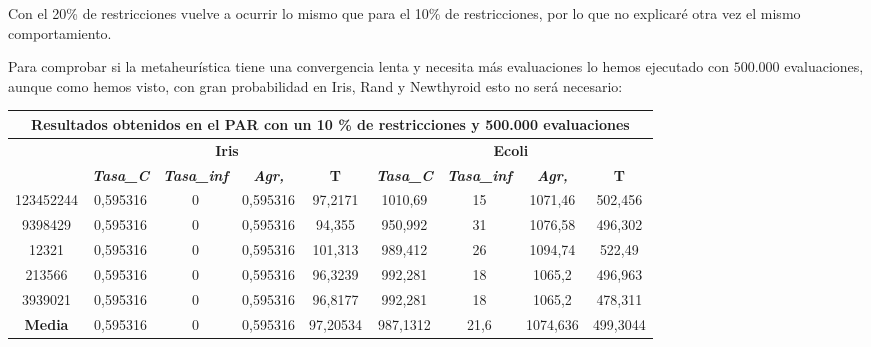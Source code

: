 \documentclass[12pt, spanish]{article}
\begin{document}
Con el 20\% de restricciones vuelve a ocurrir lo mismo que para el 10\% de restricciones, por lo que no explicaré otra vez el mismo comportamiento.

\newpage

Para comprobar si la metaheurística tiene una convergencia lenta y necesita más evaluaciones lo hemos ejecutado con $500.000$ evaluaciones, aunque como hemos visto, con gran probabilidad en Iris, Rand y Newthyroid esto no será necesario:

\begin{table}[H]
\begin{tabular}{|c|c|c|c|c|c|c|c|c|}
\hline
\multicolumn{9}{|c|}{\textbf{Resultados obtenidos en el PAR con un 10 \% de restricciones y 500.000 evaluaciones}}                                                                                                \\ \hline
\multirow{2}{*}{} & \multicolumn{4}{c|}{\textbf{Iris}}                                                            & \multicolumn{4}{c|}{\textbf{Ecoli}}                                                           \\ \cline{2-9} 
                  & \textit{\textbf{Tasa\_C}} & \textit{\textbf{Tasa\_inf}} & \textit{\textbf{Agr,}} & \textbf{T} & \textit{\textbf{Tasa\_C}} & \textit{\textbf{Tasa\_inf}} & \textit{\textbf{Agr,}} & \textbf{T} \\ \hline
123452244         & 0,595316                  & 0                           & 0,595316               & 97,2171    & 1010,69                   & 15                          & 1071,46                & 502,456    \\ \hline
9398429           & 0,595316                  & 0                           & 0,595316               & 94,355     & 950,992                   & 31                          & 1076,58                & 496,302    \\ \hline
12321             & 0,595316                  & 0                           & 0,595316               & 101,313    & 989,412                   & 26                          & 1094,74                & 522,49     \\ \hline
213566            & 0,595316                  & 0                           & 0,595316               & 96,3239    & 992,281                   & 18                          & 1065,2                 & 496,963    \\ \hline
3939021           & 0,595316                  & 0                           & 0,595316               & 96,8177    & 992,281                   & 18                          & 1065,2                 & 478,311    \\ \hline
\textbf{Media}    & 0,595316                  & 0                           & 0,595316               & 97,20534   & 987,1312                  & 21,6                        & 1074,636               & 499,3044   \\ \hline
\end{tabular}
\end{table}
\end{document}
